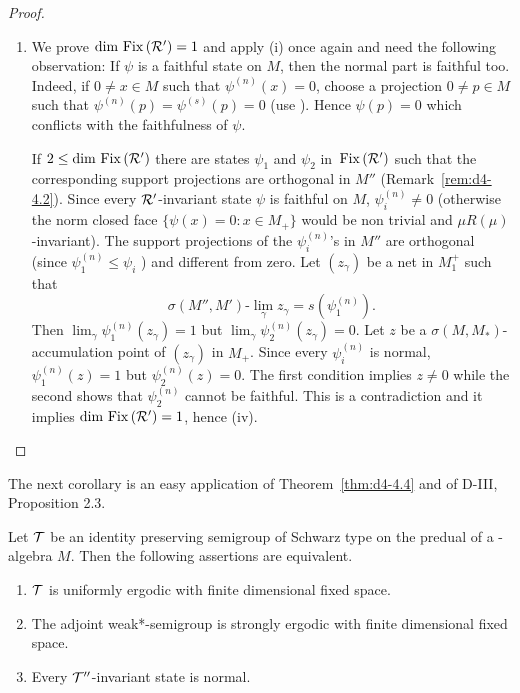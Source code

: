 \begin{proof}
\begin{enumerate}
\item
We prove $ \dim \mathop{}\mathrm{Fix}\left(\mathcal{R}'\right) = 1 $  and apply (i) once again and need the following observation: If $ \psi $  is a faithful state on $ M $,  then the normal part is faithful too.
Indeed, if $ 0 \neq x \in M $  such that $ \psi^{(n)}(x) = 0 $,  choose a projection $ 0 \neq p \in M $  such that $ \psi^{(n)}(p) = \psi^{(s)}(p) = 0 $ (use \citet[Theorem III.3.8]{takesaki:1979}). 
Hence $ \psi(p) = 0 $  which conflicts with the faithfulness of $ \psi $.

If $ 2 \leq \dim \mathop{}\mathrm{Fix}\left(\mathcal{R}'\right) $  there are states $ \psi_{1} $  and $ \psi_{2} $  in $ \mathop{}\mathrm{Fix}\left(\mathcal{R}'\right) $  such that the corresponding support projections are orthogonal in $ M'' $  (Remark~\ref{rem:d4-4.2}).
Since every $ \mathcal{R}' $-invariant state $ \psi $  is faithful on $ M $, $ \psi_{i}^{(n)} \neq 0 $  (otherwise the norm closed face $ \{\psi(x) = 0: x \in M_{+}\} $  would
be non trivial and $ \mu R(\mu) $-invariant).
The support projections of the $ \psi_{i}^{(n)} $'s in $ M'' $  are orthogonal (since $ \psi_{1}^{(n)} \leq \psi_{i} $ ) and different from zero.
Let $ (z_{\gamma}) $  be a net in $ M_{1}^{+} $  such that
\[
	\sigma(M'',M')\text{-}\lim_{\gamma} z_{\gamma} = s(\psi_{1}^{(n)}).
\]
Then $ \lim_{\gamma} \psi_{1}^{(n)}(z_{\gamma}) = 1 $  but $ \lim_{\gamma} \psi_{2}^{(n)}(z_{\gamma}) = 0 $.
Let $ z $  be a $ \sigma(M,M_{*}) $-accumulation point of $ (z_{\gamma}) $  in $ M_{+} $.
Since every $ \psi_{i}^{(n)} $  is normal, $ \psi_{1}^{(n)}(z) = 1 $  but $ \psi_{2}^{(n)}(z) = 0 $.
The first condition implies $ z \neq 0 $  while the second shows that $ \psi_{2}^{(n)} $  cannot be faithful.
This is a contradiction and it implies $ \dim \mathop{}\mathrm{Fix}\left(\mathcal{R}'\right) = 1 $, hence (iv).
\end{enumerate}
\end{proof}
The next corollary is an easy application of\/ Theorem~\ref{thm:d4-4.4} and of D-III, Proposition 2.3.
\begin{corollary}\label{cor:d4-4.5}
Let $ \mathcal{T} $  be an identity preserving semigroup of Schwarz type on the predual of a \WA-algebra $ M $.
Then the following assertions are equivalent.
\begin{enumerate}[\upshape (a)]
\item
$ \mathcal{T} $  is uniformly ergodic with finite dimensional fixed space.

\item
The adjoint weak*-semigroup is strongly ergodic with finite dimensional fixed space.

\item
Every $ \mathcal{T}'' $-invariant state is normal.
\end{enumerate}
\end{corollary}
